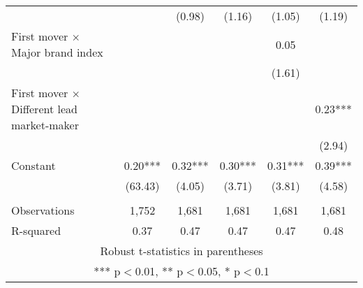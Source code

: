 \documentclass[]{article}
\begin{document}
\begin{tabular}{lccccc}
 &  & (0.98) & (1.16) & (1.05) & (1.19) \\
First mover $\times$ Major brand index &  &  &  & 0.05 &  \\
 &  &  &  & (1.61) &  \\
First mover $\times$ Different lead market-maker &  &  &  &  & 0.23*** \\
 &  &  &  &  & (2.94) \\
Constant & 0.20*** & 0.32*** & 0.30*** & 0.31*** & 0.39*** \\
 & (63.43) & (4.05) & (3.71) & (3.81) & (4.58) \\
 &  &  &  &  &  \\
Observations & 1,752 & 1,681 & 1,681 & 1,681 & 1,681 \\
 R-squared & 0.37 & 0.47 & 0.47 & 0.47 & 0.48 \\ \hline
\multicolumn{6}{c}{ Robust t-statistics in parentheses} \\
\multicolumn{6}{c}{ *** p$<$0.01, ** p$<$0.05, * p$<$0.1} \\
\end{tabular}
\end{document}
